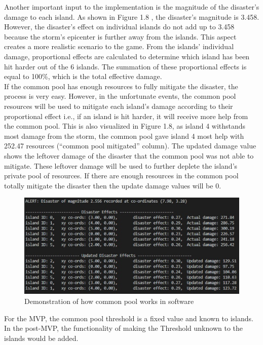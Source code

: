 Another important input to the implementation is the magnitude of the disaster’s damage to each island. As shown in Figure 1.8 , the disaster’s magnitude is 3.458. However, the disaster’s effect on individual islands do not add up to 3.458 because the storm’s epicenter is further away from the islands. This aspect creates a more realistic scenario to the game. From the islands’ individual damage, proportional effects are calculated to determine which island has been hit harder out of the 6 islands. The summation of these proportional effects is equal to 100\%, which is the total effective damage. \\

If the common pool has enough resources to fully mitigate the disaster, the process is very easy. However, in the unfortunate events, the common pool resources will be used to mitigate each island's damage according to their proportional effect i.e., if an island is hit harder, it will receive more help from the common pool. This is also visualized in Figure 1.8, as island 4 withstands most damage from the storm, the common pool gave island 4 most help with 252.47 resources (“common pool mitigated” column). The updated damage value shows the leftover damage of the disaster that the common pool was not able to mitigate. These leftover damage will be used to further deplete the island's private pool of resources. If there are enough resources in the common pool totally mitigate the disaster then the update damage values will be 0.\\

\begin{figure}[!htb]
    \centering
    \includegraphics[width=1\textwidth]{04_environment/Images/Common Pool infrastructure outcome.PNG}
    \caption{Demonstration of how common pool works in software}
    \label{Images:Common Pool infrastructure outcome}
\end{figure}

For the MVP, the common pool threshold is a fixed value and known to islands. In the post-MVP, the functionality of making the Threshold unknown to the islands would be added. \\

